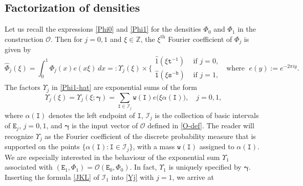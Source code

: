 \documentclass[12pt, twoside]{article}
\theoremstyle{definition}
\numberwithin{equation}{section}
\begin{document}
\subsection{Factorization of densities}  \label{density-factorization-section} 
Let us recall the expressions \eqref{Phi0} and \eqref{Phi1} for the densities $\Phi_0$ and $\Phi_1$ in the construction $\mathscr{O}$. Then  for $j=0,1$ and $\xi \in \mathbb Z$, the $\xi^{\text{th}}$ Fourier coefficient of $\Phi_j$ is given by 
\begin{equation}  \label{Phi1-hat} 
\widehat{\Phi}_j(\xi) = \int_{0}^{1} \Phi_j(x) e(x \xi) \, dx  =:  \Upsilon_j(\xi) \times \Biggl\{\begin{aligned} \widehat{1}(\xi \mathtt t^{-1}) &\text{ if } j = 0, \\  \widehat{\mathtt 1}(\xi \mathtt s^{-\mathtt b}) &\text{ if } j =1,  \end{aligned}  \; \text{ where } \; e(y) := e^{-2 \pi i y}. 
\end{equation}  
The factors $\Upsilon_j$ in \eqref{Phi1-hat} are exponential sums of the form 
\begin{equation} \label{Yj}  
\Upsilon_j(\xi) = \Upsilon_j(\xi; \pmb{\gamma}) = \sum_{\mathtt I \in \mathscr{I}_j} \mathtt w(\mathtt I) e \bigl(\xi \alpha(\mathtt I) \bigr), \quad j = 0, 1, 
\end{equation} 
where $\alpha(\mathtt I)$ denotes the left endpoint of $\mathtt I$, $\mathscr{I}_j$ is the collection of basic intervals of $\mathtt E_j$, $j = 0, 1$,
and $\pmb{\gamma}$ is the input vector of $\mathscr{O}$ defined in \eqref{O-def}. The reader will recognize $\Upsilon_j$ as the Fourier coefficient of the discrete probability measure that is supported on the points $\{\alpha(\mathtt I) : \mathtt I \in \mathscr{I}_j\}$, with a mass $\mathtt w(\mathtt I)$ assigned to $\alpha(\mathtt I)$. We are especially interested in the behaviour of the exponential sum $\Upsilon_1$ associated with $(\mathtt E_1, \Phi_1) = \mathscr{O}(\mathtt E_0, \Phi_0)$. In fact, $\Upsilon_1$ is uniquely specified by $\pmb{\gamma}$.
Inserting the formula \eqref{JKL} of $\mathscr I_1$ into \eqref{Yj} with $j = 1$, we arrive at       
\end{document}
